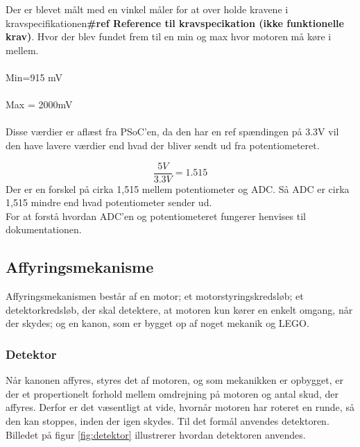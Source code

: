 Der er blevet målt med en vinkel måler for at over holde kravene i kravspecifikationen\textbf{\#ref Reference til kravspecikation (ikke funktionelle krav)}. Hvor der blev fundet frem til en min og max hvor motoren må køre i mellem. \\
\\
Min=915 mV\\
\\
Max = 2000mV\\
\\
Disse værdier er aflæst fra PSoC’en, da den har en ref spændingen på 3.3V vil den have lavere værdier end hvad der bliver sendt ud fra potentiometeret.


\begin{equation}
 \frac {5V} {3.3V}= 1.515
\end{equation}
Der er en forskel på cirka 1,515 mellem potentiometer og ADC. Så ADC er cirka 1,515 mindre end hvad potentiometer sender ud.
\\
For at forstå hvordan ADC’en og potentiometeret fungerer henvises til dokumentationen.


\subsection{Affyringsmekanisme}
Affyringsmekanismen består af en motor; et motorstyringskredsløb; et detektorkredsløb, der skal detektere, at motoren kun kører en enkelt omgang, når der skydes; og en kanon, som er bygget op af noget mekanik og LEGO. 

\subsubsection{Detektor}
Når kanonen affyres, styres det af motoren, og som mekanikken er opbygget, er der et propertionelt forhold mellem omdrejning på motoren og antal skud, der affyres. Derfor er det væsentligt at vide, hvornår motoren har roteret en runde, så den kan stoppes, inden der igen skydes. Til det formål anvendes detektoren. Billedet på figur \ref{fig:detektor} illustrerer hvordan detektoren anvendes.

